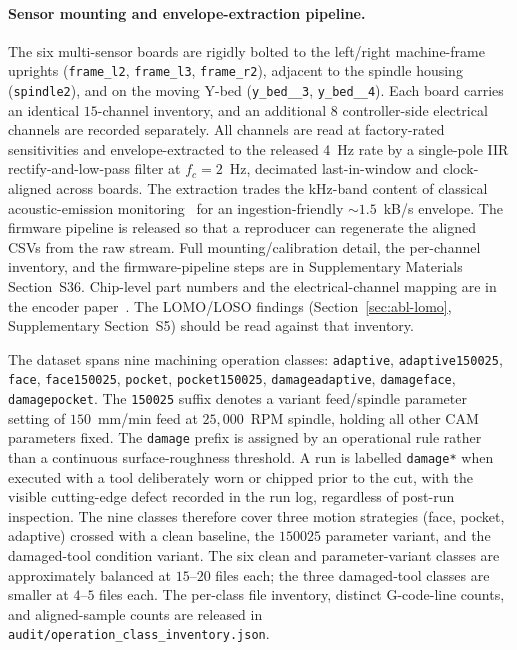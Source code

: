 \documentclass[sensors,article,submit,moreauthors,pdftex]{Definitions/mdpi}
\begin{document}
\paragraph{Sensor mounting and envelope-extraction pipeline.} The six multi-sensor boards are rigidly bolted to the left/right machine-frame uprights (\texttt{frame\_l2}, \texttt{frame\_l3}, \texttt{frame\_r2}), adjacent to the spindle housing (\texttt{spindle2}), and on the moving Y-bed (\texttt{y\_bed\_\_3}, \texttt{y\_bed\_\_4}). Each board carries an identical $15$-channel inventory, and an additional 8 controller-side electrical channels are recorded separately. All channels are read at factory-rated sensitivities and envelope-extracted to the released 4~Hz rate by a single-pole IIR rectify-and-low-pass filter at $f_c\!=\!2$~Hz, decimated last-in-window and clock-aligned across boards. The extraction trades the kHz-band content of classical acoustic-emission monitoring~\cite{teti2010advanced} for an ingestion-friendly $\sim 1.5$~kB/s envelope. The firmware pipeline is released so that a reproducer can regenerate the aligned CSVs from the raw stream. Full mounting/calibration detail, the per-channel inventory, and the firmware-pipeline steps are in Supplementary Materials Section~S36. Chip-level part numbers and the electrical-channel mapping are in the encoder paper~\cite{encoder_paper}. The LOMO/LOSO findings (Section~\ref{sec:abl-lomo}, Supplementary Section~S5) should be read against that inventory.

The dataset spans nine machining operation classes: \texttt{adaptive}, \texttt{adaptive150025}, \texttt{face}, \texttt{face150025}, \texttt{pocket}, \texttt{pocket150025}, \texttt{damageadaptive}, \texttt{damageface}, \texttt{damagepocket}. The \texttt{150025} suffix denotes a variant feed/spindle parameter setting of $150$~mm/min feed at $25{,}000$~RPM spindle, holding all other CAM parameters fixed. The \texttt{damage} prefix is assigned by an operational rule rather than a continuous surface-roughness threshold. A run is labelled \texttt{damage*} when executed with a tool deliberately worn or chipped prior to the cut, with the visible cutting-edge defect recorded in the run log, regardless of post-run inspection. The nine classes therefore cover three motion strategies (face, pocket, adaptive) crossed with a clean baseline, the $150025$ parameter variant, and the damaged-tool condition variant. The six clean and parameter-variant classes are approximately balanced at $15$--$20$ files each; the three damaged-tool classes are smaller at $4$--$5$ files each. The per-class file inventory, distinct G-code-line counts, and aligned-sample counts are released in \texttt{audit/operation\_class\_inventory.json}.
\end{document}
